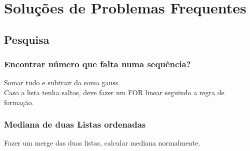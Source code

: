 \chapter{Soluções de Problemas Frequentes}
\section*{Pesquisa}
\subsection*{Encontrar número que falta numa sequência?}
Somar tudo e subtrair da soma gauss.\\
Caso a lista tenha saltos, deve fazer um FOR linear seguindo a regra de formação.

\subsection*{Mediana de duas Listas ordenadas}
Fazer um merge das duas listas,
calcular mediana normalmente.

